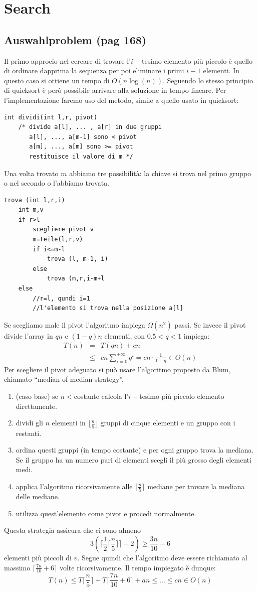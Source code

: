 \documentclass[a4paper]{book}
\begin{document}
\chapter{Search}
\section{Auswahlproblem (pag 168)}
Il primo approcio nel cercare di trovare l'$i-$tesimo elemento più piccolo è quello di ordinare dapprima la sequenza per poi eliminare i primi $i-1$ elementi. In questo caso si ottiene un tempo di $O(n \log (n))$. Seguendo lo stesso principio di quicksort è però possibile arrivare alla soluzione in tempo lineare. Per l'implementazione faremo uso del metodo, simile a quello usato in quicksort:
\begin{lstlisting}
int dividi(int l,r, pivot)
	/* divide a[l], ... , a[r] in due gruppi
	   a[l], ..., a[m-1] sono < pivot
	   a[m], ..., a[m] sono >= pivot
	   restituisce il valore di m */
\end{lstlisting}
Una volta trovato $m$ abbiamo tre possibilità: la chiave si trova nel primo gruppo o nel secondo o l'abbiamo trovata.
\begin{lstlisting}
trova (int l,r,i)
	int m,v
	if r>l
		scegliere pivot v
		m=teile(l,r,v)
		if i<=m-l
			trova (l, m-1, i)
		else
			trova (m,r,i-m+l
	else
		//r=l, qundi i=1
		//l'elemento si trova nella posizione a[l]	 			
\end{lstlisting}
Se scegliamo male il pivot l'algoritmo impiega $\Omega (n^2)$ passi. Se invece il pivot divide l'array in $qn$ e $(1-q)n$ elementi, con $0.5<q<1$ impiega:
\begin{eqnarray}
T(n) &=& T(qn)+cn \nonumber \\
& \leq & cn \sum_{i=0}^{+\infty} q^i = cn \cdot\frac{1}{1-q} \in O(n)
\end{eqnarray}
Per scegliere il pivot adeguato si può usare l'algoritmo proposto da Blum, chiamato ``median of median strategy''.
\begin{enumerate}
\item (caso base) se $n<$costante calcola l'$i-$tesimo più piccolo elemento direttamente.
\item dividi gli $n$ elementi in $\lfloor \frac{n}{5} \rfloor$ gruppi di cinque elementi e un gruppo con i restanti. 
\item ordina questi gruppi (in tempo costante) e per ogni gruppo trova la mediana. Se il gruppo ha un numero pari di elementi scegli il più grosso degli elementi medi. 
\item applica l'algoritmo ricorsivamente alle $\lceil \frac{n}{5} \rceil$ mediane per trovare la mediana delle mediane.
\item utilizza quest'elemento come pivot e procedi normalmente.
\end{enumerate}
Questa strategia assicura che ci sono almeno 
$$ 3\left(\lceil \frac{1}{2} \lceil \frac{n}{5} \rceil \rceil -2\right) \geq \frac{3n}{10} -6$$
elementi più piccoli di $v$. Segue quindi che l'algoritmo deve essere richiamato al massimo $ \lceil \frac{7n}{10} + 6 \rceil$ volte ricorsivamente. Il tempo impiegato è dunque:
$$ T(n) \leq T\lceil \frac{n}{5} \rceil +T \lceil \frac{7n}{10} +6 \rceil + an \leq ... \leq cn \in O(n) $$
\end{document}
